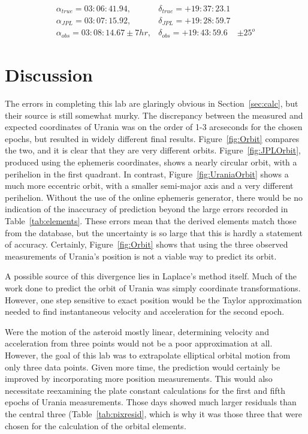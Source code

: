 \documentclass[a4paper,12pt]{article}
\begin{document}
\begin{eqnarray}
\alpha_{true} = 03:06:41.94, & \delta_{true} = +19:37:23.1 & \nonumber\\
\alpha_{JPL} = 03:07:15.92, & \delta_{JPL} = +19:28:59.7 & \nonumber\\
\alpha_{obs} = 03:08:14.67 \pm 7 hr, & \delta_{obs} = +19:43:59.6 & \pm 25^o\nonumber
\end{eqnarray}

\section{Discussion}
\label{sec:discussion}

The errors in completing this lab are glaringly obvious in Section~\ref{sec:calc}, but their source is still somewhat murky. The discrepancy between the measured and expected coordinates of Urania was on the order of 1-3 arcseconds for the chosen epochs, but resulted in widely different final results. Figure~\ref{fig:Orbit} compares the two, and it is clear that they are very different orbits. Figure~\ref{fig:JPLOrbit}, produced using the ephemeris coordinates, shows a nearly circular orbit, with a perihelion in the first quadrant. In contrast, Figure~\ref{fig:UraniaOrbit} shows a much more eccentric orbit, with a smaller semi-major axis and a very different perihelion. Without the use of the online ephemeris generator, there would be no indication of the inaccuracy of prediction beyond the large errors recorded in Table~\ref{tab:elements}. These errors mean that the derived elements match those from the database, but the uncertainty is so large that this is hardly a statement of accuracy. Certainly, Figure~\ref{fig:Orbit} shows that using the three observed measurements of Urania's position is not a viable way to predict its orbit.

A possible source of this divergence lies in Laplace's method itself. Much of the work done to predict the orbit of Urania was simply coordinate transformations. However, one step sensitive to exact position would be the Taylor approximation needed to find instantaneous velocity and acceleration for the second epoch. 

Were the motion of the asteroid mostly linear, determining velocity and acceleration from three points would not be a poor approximation at all. However, the goal of this lab was to extrapolate elliptical orbital motion from only three data points. Given more time, the prediction would certainly be improved by incorporating more position measurements. This would also necessitate reexamining the plate constant calculations for the first and fifth epochs of Urania measurements. Those days showed much larger residuals than the central three (Table~\ref{tab:pixresid}, which is why it was those three that were chosen for the calculation of the orbital elements. 
\end{document}
